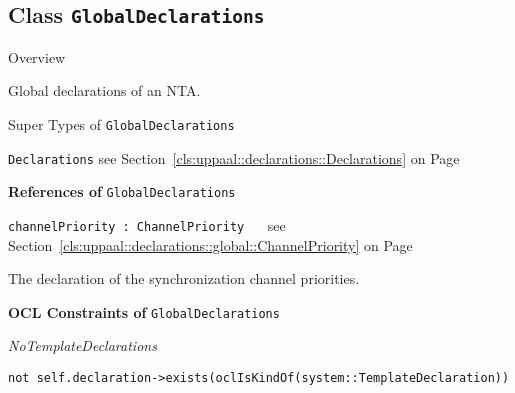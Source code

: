 \subsection{Class \bfseries \texttt{GlobalDeclarations}\normalfont}
\label{cls:uppaal::declarations::GlobalDeclarations} 
	
	\begin{longdescription}
		\item[Overview] 		
				

	

		Global declarations of an NTA.		
		\item[Super Types of \texttt{GlobalDeclarations}] ~
			\begin{longdescription}
				\item[\texttt{Declarations}] see Section~\ref{cls:uppaal::declarations::Declarations} on Page~\pageref{cls:uppaal::declarations::Declarations}						\end{longdescription}
		
	
			\item[\textbf{References of} \texttt{GlobalDeclarations}] ~
			\begin{longdescription}
	\item[\texttt{channelPriority : ChannelPriority 	}] ~
	see Section~\ref{cls:uppaal::declarations::global::ChannelPriority} on Page~\pageref{cls:uppaal::declarations::global::ChannelPriority}
	
	\nopagebreak
		
				

	

		The declaration of the synchronization channel priorities.		
			\end{longdescription}
			\item[\textbf{OCL Constraints of} \texttt{GlobalDeclarations}] ~
			\begin{longdescription}
	\item[\small\textit{NoTemplateDeclarations}] ~ 
	\nopagebreak
	
		\begin{lstlisting}[breaklines=true]
not self.declaration->exists(oclIsKindOf(system::TemplateDeclaration))		\end{lstlisting}
			\end{longdescription}
	
	\end{longdescription}
	

